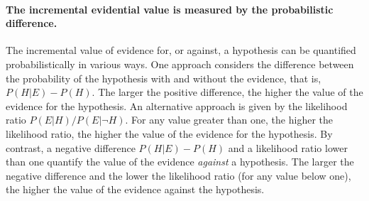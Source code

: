 \documentclass[10pt]{article}
\begin{document}
\paragraph{The incremental evidential value is measured by the probabilistic difference.}
The incremental value of evidence for, or against, a hypothesis 
can be quantified probabilistically in various ways. 
One approach considers the difference between the probability of 
the hypothesis with and without the evidence, that is, $P(H | E) - P(H)$.
The larger the positive difference, the higher the value of the evidence 
for the hypothesis. 
An alternative approach is given by the likelihood ratio $P(E|H)/P(E| \neg H)$. 
For any value greater than one, the higher the likelihood ratio, 
the higher the value of the evidence for the hypothesis. 
%
%
By contrast, a negative difference $P(H | E) - P(H)$ and a likelihood ratio lower than one  
quantify the value of the evidence \textit{against} a hypothesis.
The larger the negative difference and the lower the likelihood ratio (for any value below one), 
the higher the value of the evidence against the hypothesis.
\end{document}
